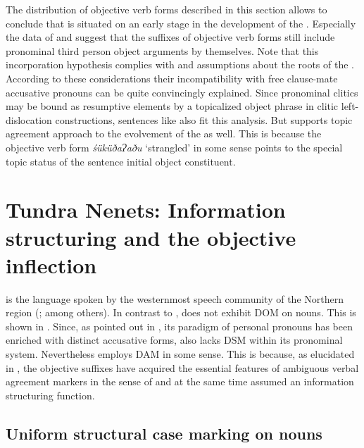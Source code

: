 \documentclass[output=paper]{LSP/langsci}
\begin{document}
The distribution of objective verb forms described in this section allows to conclude that  is situated on an early stage in the development of the . Especially the data of  and  suggest that the suffixes of objective verb forms still include pronominal third person object arguments by themselves. Note that this incorporation hypothesis complies with  and  assumptions about the roots of the  . According to these considerations their incompatibility with free clause-mate accusative pronouns can be quite convincingly explained. Since pronominal clitics may be bound as resumptive elements by a topicalized object phrase in clitic left-dislocation constructions, sentences like  also fit this analysis. But  supports  topic agreement approach to the evolvement of the  as well. 
This is because the objective verb form \textit{śüküðaɁaðu} ‘strangled’ in some sense points to the special topic status of the sentence initial object constituent. 


\section{Tundra Nenets: Information structuring and the objective inflection }
\label{12-wr-sec:4}

 is the language spoken by the westernmost speech community of the Northern  region (\cf \citealt[iv]{Abondolo1998Uralic}; \citealt{Nikolaeva2014Grammar} among others). In contrast to ,  does not exhibit DOM on nouns. This is shown in . Since, as pointed out in , its paradigm of personal pronouns has been enriched with distinct accusative forms,  also lacks DSM within its pronominal system. Nevertheless  employs DAM in some sense. 
This is because, as elucidated in , the  objective suffixes have acquired the essential features of ambiguous verbal agreement markers in the sense of \citet[225--331]{Siewierska1999Anaphoric} and at the same time assumed an information structuring function. 


\subsection{Uniform structural case marking on nouns}\label{12-wr-sec:4-1}
\end{document}

